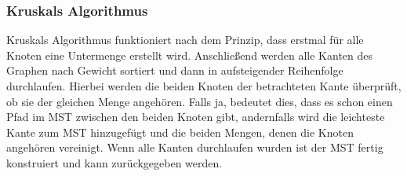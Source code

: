 \documentclass[
../../AuD-Zusammenfassung.tex,
]
{subfiles}
\begin{document}
\subsubsection{Kruskals Algorithmus}
Kruskals Algorithmus funktioniert nach dem Prinzip, dass erstmal für alle Knoten eine Untermenge erstellt wird. Anschließend werden alle Kanten des Graphen nach Gewicht sortiert und dann in aufsteigender Reihenfolge durchlaufen. Hierbei werden die beiden Knoten der betrachteten Kante überprüft, ob sie der gleichen Menge angehören. Falls ja, bedeutet dies, dass es schon einen Pfad im MST zwischen den beiden Knoten gibt, andernfalls wird die leichteste Kante zum MST hinzugefügt und die beiden Mengen, denen die Knoten angehören vereinigt. Wenn alle Kanten durchlaufen wurden ist der MST fertig konstruiert und kann zurückgegeben werden.\\
\begin{algorithm}[H]
\end{algorithm}
\end{document}
